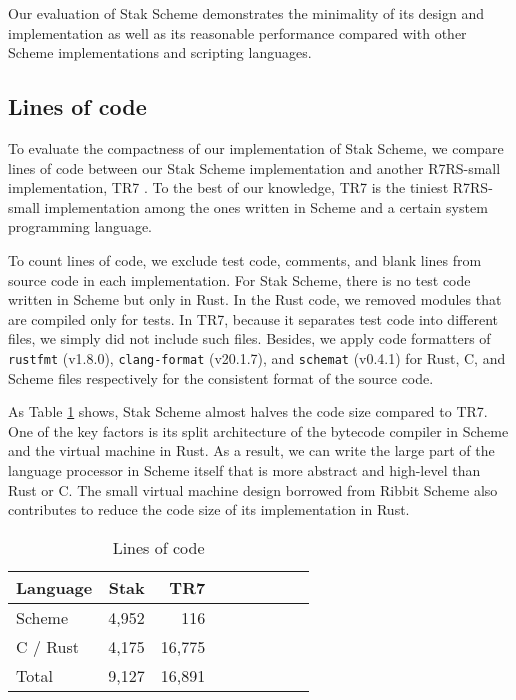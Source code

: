 \documentclass[sigplan]{acmart}
\begin{document}
Our evaluation of Stak Scheme demonstrates the minimality of its design and
implementation as well as its reasonable performance compared with
other Scheme implementations and scripting languages.

\subsection{Lines of code}

To evaluate the compactness of our implementation of Stak Scheme,
we compare lines of code between our Stak Scheme implementation and
another R7RS-small implementation, TR7 \cite{tr7}.
To the best of our knowledge, TR7 is the tiniest R7RS-small implementation
among the ones written in Scheme and a certain system programming language.

To count lines of code, we exclude test code, comments, and blank
lines from source code in each implementation.
For Stak Scheme, there is no test code written in Scheme but only in Rust.
In the Rust code, we removed modules that are compiled only for tests.
In TR7, because it separates test code into different files, we simply did not
include such files.
Besides, we apply code formatters of \texttt{rustfmt} (v1.8.0),
\texttt{clang-format} (v20.1.7), and \texttt{schemat} (v0.4.1) for
Rust, C, and Scheme files respectively for the consistent format of
the source code.

As Table \ref{table:loc} shows, Stak Scheme almost
halves the code size compared to TR7.
One of the key factors is its split architecture of the bytecode
compiler in Scheme and the virtual machine in Rust.
As a result, we can write the large part of the language processor in Scheme
itself that is more abstract and high-level than Rust or C.
The small virtual machine design borrowed from Ribbit Scheme also
contributes to reduce the code size of its implementation in Rust.

\begin{table}
  \begin{center}
    \begin{tabular}{l|rrrrrrrr}
      \hline
      Language & Stak & TR7  \\
      \hline
      Scheme & 4,952 & 116 \\
      C / Rust & 4,175 & 16,775 \\
      Total & 9,127 & 16,891 \\
      \hline
    \end{tabular}

    \caption{Lines of code}
    \label{table:loc}
  \end{center}
\end{table}
\end{document}
